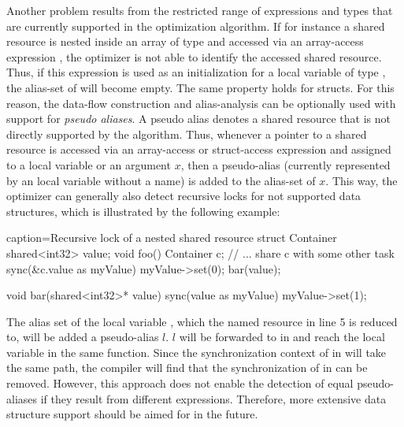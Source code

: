 Another problem results from the restricted range of expressions and types that are currently supported in the optimization algorithm. If for instance a shared resource is nested inside an array  of type  and accessed via an array-access expression , the optimizer is not able to identify the accessed shared resource. Thus, if this expression is used as an initialization for a local variable  of type , the alias-set of  will become empty. The same property holds for structs. For this reason, the data-flow construction and alias-analysis can be optionally used with support for \textit{pseudo aliases}. A pseudo alias denotes a shared resource that is not directly supported by the algorithm. Thus, whenever a pointer to a shared resource is accessed via an array-access or struct-access expression and assigned to a local variable or an argument $x$, then a pseudo-alias (currently represented by an local variable without a name) is added to the alias-set of $x$. This way, the optimizer can generally also detect recursive locks for not supported data structures, which is illustrated by the following example:
\begin{ccode}{caption=Recursive lock of a nested shared resource}
struct Container { shared<int32> value; }
void foo() {
  Container c;
  // ... share c with some other task
  sync(&c.value as myValue) {
    myValue->set(0);
    bar(value);
  }
}

void bar(shared<int32>* value) {
  sync(value as myValue) { myValue->set(1); }
}
\end{ccode}
The alias set of the local variable , which the named resource in line 5 is reduced to, will be added a pseudo-alias $l$. $l$ will be forwarded to  in  and reach the local variable  in the same function. Since the synchronization context of  in  will take the same path, the compiler will find that the synchronization of  in  can be removed. However, this approach does not enable the detection of equal pseudo-aliases if they result from different expressions. Therefore, more extensive data structure support should be aimed for in the future.

